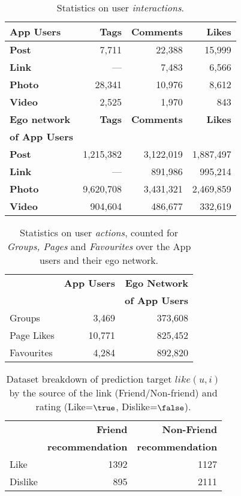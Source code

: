 \begin{table}[t!]
\centering
\begin{tabular}{|>{\small}l|>{\small}r|>{\small}r|>{\small}r|}
\hline
\textbf{App Users} & \textbf{Tags} & \textbf{Comments} & \textbf{Likes} \\
\hline
\textbf{Post} & 7,711 & 22,388 & 15,999 \\
\hline
\textbf{Link}  & --- & 7,483 & 6,566 \\
\hline
\textbf{Photo} & 28,341 & 10,976 & 8,612 \\
\hline
\textbf{Video} & 2,525 & 1,970 & 843 \\
\hline
\hline
\textbf{Ego network} & \textbf{Tags} & \textbf{Comments} & \textbf{Likes} \\
\textbf{of App Users}  & & & \\
\hline
\textbf{Post} & 1,215,382 & 3,122,019 & 1,887,497 \\
\hline
\textbf{Link} & --- & 891,986 & 995,214 \\
\hline
\textbf{Photo} & 9,620,708 & 3,431,321 & 2,469,859 \\
\hline
\textbf{Video} & 904,604 & 486,677 & 332,619 \\
\hline
\end{tabular}
\caption{Statistics on user {\em interactions}.
}
\label{tab:interactions}
\end{table}

\begin{table}[t!]
\centering
\begin{tabular}{|>{\small}l|>{\small}r|>{\small}r|}
\hline
& \textbf{App Users} & \textbf{Ego Network} \\
& & \textbf{of App Users} \\
\hline
Groups & 3,469 & 373,608 \\
\hline
Page Likes & 10,771 & 825,452 \\
\hline
Favourites & 4,284 & 892,820\\
\hline
\end{tabular}
\caption{Statistics on user {\em actions}, counted for {\em Groups, Pages} and {\em Favourites} over the App users and their ego network.}
\label{tab:interests}
\end{table}

\begin{table}[t!]
\centering
\begin{tabular}{|>{\small}l|>{\small}r|>{\small}r|}\hline
&\textbf{Friend}  & \textbf{Non-Friend} \\
&\textbf{recommendation}  & \textbf{recommendation} \\
\hline
Like& 1392 & 1127 \\
\hline
Dislike& 895 & 2111\\
\hline
\end{tabular}
\caption{Dataset breakdown of prediction target $like(u,i)$ by the source of the link (Friend/Non-friend) and rating (Like=$\true$, Dislike=$\false$).}
\label{tab:likeinfo}
\end{table}

